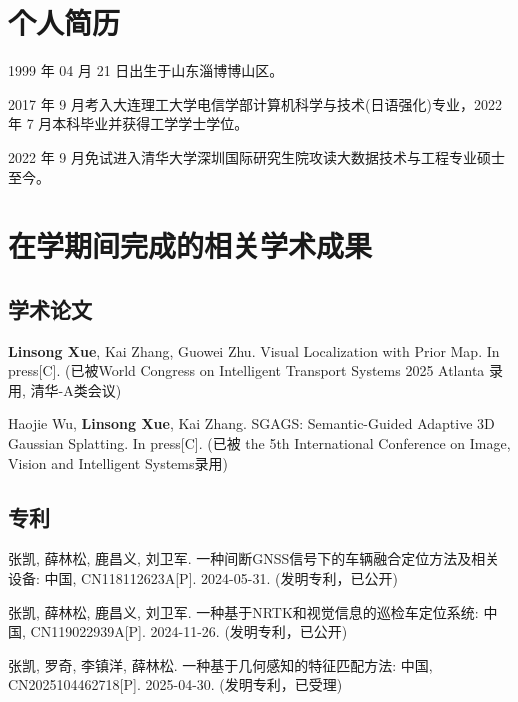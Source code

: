 
\begin{resume}

  \section*{个人简历}

  1999 年 04 月 21 日出生于山东淄博博山区。

  2017 年 9 月考入大连理工大学电信学部计算机科学与技术(日语强化)专业，2022 年 7 月本科毕业并获得工学学士学位。

  2022 年 9 月免试进入清华大学深圳国际研究生院攻读大数据技术与工程专业硕士至今。


  \section*{在学期间完成的相关学术成果}

  \subsection*{学术论文}

  \begin{achievements}
    \item \textbf{Linsong Xue}, Kai Zhang, Guowei Zhu. Visual Localization with Prior Map. In press[C]. (已被World Congress on Intelligent Transport Systems 2025 Atlanta 录用, 清华-A类会议)
    \item Haojie Wu, \textbf{Linsong Xue}, Kai Zhang. SGAGS: Semantic-Guided Adaptive 3D Gaussian Splatting. In press[C]. (已被 the 5th International Conference on Image, Vision and Intelligent Systems录用)
  \end{achievements}


  \subsection*{专利}

  \begin{achievements}
    \item 张凯, 薛林松, 鹿昌义, 刘卫军. 一种间断GNSS信号下的车辆融合定位方法及相关设备: 中国, CN118112623A[P]. 2024-05-31. (发明专利，已公开)
    \item 张凯, 薛林松, 鹿昌义, 刘卫军. 一种基于NRTK和视觉信息的巡检车定位系统: 中国, CN119022939A[P]. 2024-11-26. (发明专利，已公开)
    \item 张凯, 罗奇, 李镇洋, 薛林松. 一种基于几何感知的特征匹配方法: 中国, CN2025104462718[P]. 2025-04-30. (发明专利，已受理)
  \end{achievements}

\end{resume}

